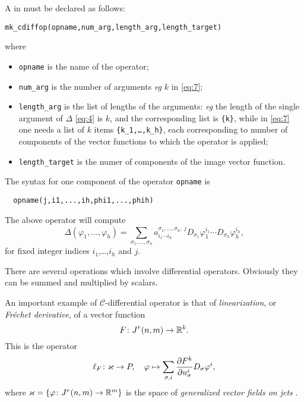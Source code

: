 A \cdiffop in \cde must be declared as follows:
\begin{verbatim}
mk_cdiffop(opname,num_arg,length_arg,length_target)
\end{verbatim}
where
\begin{itemize}
\item \texttt{opname} is the name of the operator;
\item \texttt{num\_arg} is the number of arguments \emph{eg} $k$ in
  \eqref{eq:7};
\item \texttt{length\_arg} is the list of lengths of the arguments: \emph{eg}
  the length of the single argument of $\Delta$ \eqref{eq:4} is $k$, and the
  corresponding list is \texttt{\{k\}}, while in \eqref{eq:7} one needs a list
  of $k$ items \texttt{\{k\_1,\dots,k\_h\}}, each corresponding to number of
  components of the vector functions to which the operator is applied;
\item \texttt{length\_target} is the numer of components of the image vector
  function.
\end{itemize}
The syntax for one component of the operator \texttt{opname} is
\begin{verbatim}
  opname(j,i1,...,ih,phi1,...,phih)
\end{verbatim}
The above operator will compute
\begin{equation}
  \label{eq:10}
  \Delta(\varphi_1,\dots,\varphi_h) = \sum_{\sigma_1,\ldots,\sigma_h}
  a^{\sigma_1,\ldots,\sigma_h,\ j}_{i_1\cdots i_h}
  D_{\sigma_1} \varphi_1^{i_1}\cdots D_{\sigma_h}\varphi_h^{i_h},
\end{equation}
for fixed integer indices $i_1$,\dots,$i_h$ and $j$.

\medskip

There are several operations which involve differential operators. Obviously
they can be summed and multiplied by scalars.

An important example of $\mathcal{C}$-differential operator is that of
\emph{linearization}, or \emph{Fr\'echet derivative}, of a vector function
\begin{displaymath}
    F\colon J^r(n,m) \to \mathbb{R}^k.
\end{displaymath}
This is the operator
\begin{displaymath}
  \ell_F\colon \varkappa \to P ,\quad \varphi \mapsto
  \sum_{\sigma, i}\pd{F^k}{u^i_\sigma}D_\sigma\varphi^i,
\end{displaymath}
where $\varkappa = \{ \varphi \colon J^r(n,m) \to \mathbb{R}^m \}$ is the space of
\emph{generalized vector fields on jets} \cite{Krasilshchik:99,Olver:93}.


